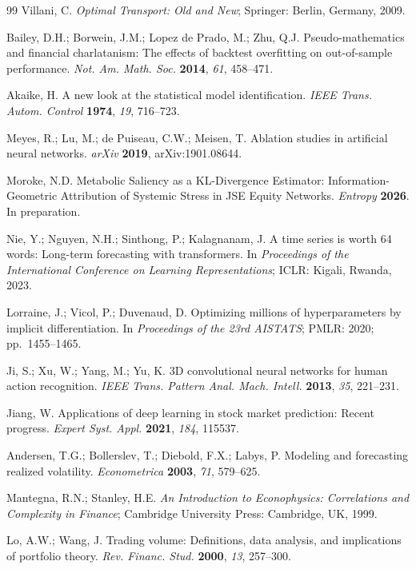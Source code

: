 \documentclass[11pt,a4paper]{article}  %
\theoremstyle{plain}
\theoremstyle{definition}
\theoremstyle{remark}
\begin{document}
\begin{thebibliography}{99}
Villani, C. \textit{Optimal Transport: Old and New};
Springer: Berlin, Germany, 2009.

Bailey, D.H.; Borwein, J.M.; Lopez de Prado, M.; Zhu, Q.J.
Pseudo-mathematics and financial charlatanism: The effects of
backtest overfitting on out-of-sample performance.
\textit{Not. Am. Math. Soc.} \textbf{2014}, \textit{61}, 458--471.

Akaike, H. A new look at the statistical model identification.
\textit{IEEE Trans. Autom. Control} \textbf{1974}, \textit{19}, 716--723.

Meyes, R.; Lu, M.; de Puiseau, C.W.; Meisen, T. Ablation studies in
artificial neural networks. \textit{arXiv} \textbf{2019}, arXiv:1901.08644.


Moroke, N.D. Metabolic Saliency as a KL-Divergence Estimator:
Information-Geometric Attribution of Systemic Stress in JSE Equity
Networks. \textit{Entropy} \textbf{2026}. In preparation.

Nie, Y.; Nguyen, N.H.; Sinthong, P.; Kalagnanam, J. A time series
is worth 64 words: Long-term forecasting with transformers.
In \textit{Proceedings of the International Conference on Learning
Representations}; ICLR: Kigali, Rwanda, 2023.

Lorraine, J.; Vicol, P.; Duvenaud, D. Optimizing millions of
hyperparameters by implicit differentiation.
In \textit{Proceedings of the 23rd AISTATS}; PMLR: 2020;
pp.~1455--1465.

Ji, S.; Xu, W.; Yang, M.; Yu, K. 3D convolutional neural networks
for human action recognition.
\textit{IEEE Trans. Pattern Anal. Mach. Intell.} \textbf{2013},
\textit{35}, 221--231.

Jiang, W. Applications of deep learning in stock market prediction:
Recent progress.
\textit{Expert Syst. Appl.} \textbf{2021}, \textit{184}, 115537.

Andersen, T.G.; Bollerslev, T.; Diebold, F.X.; Labys, P.
Modeling and forecasting realized volatility.
\textit{Econometrica} \textbf{2003}, \textit{71}, 579--625.

Mantegna, R.N.; Stanley, H.E. \textit{An Introduction to
Econophysics: Correlations and Complexity in Finance};
Cambridge University Press: Cambridge, UK, 1999.

Lo, A.W.; Wang, J. Trading volume: Definitions, data analysis,
and implications of portfolio theory.
\textit{Rev. Financ. Stud.} \textbf{2000}, \textit{13}, 257--300.



\end{thebibliography}
\end{document}

